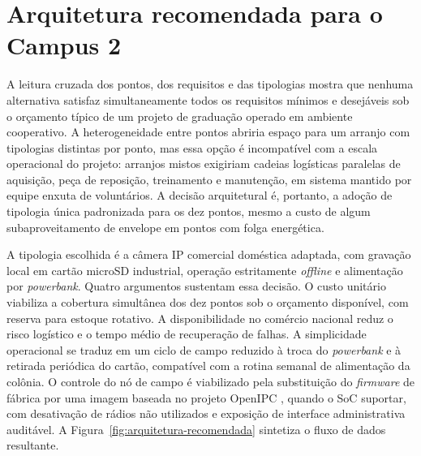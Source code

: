 \section{Arquitetura recomendada para o Campus 2}
\label{sec:cap2-arquitetura}


A leitura cruzada dos pontos, dos requisitos e das tipologias mostra que nenhuma alternativa satisfaz simultaneamente todos os requisitos mínimos e desejáveis sob o orçamento típico de um projeto de graduação operado em ambiente cooperativo. A heterogeneidade entre pontos abriria espaço para um arranjo com tipologias distintas por ponto, mas essa opção é incompatível com a escala operacional do projeto: arranjos mistos exigiriam cadeias logísticas paralelas de aquisição, peça de reposição, treinamento e manutenção, em sistema mantido por equipe enxuta de voluntários. A decisão arquitetural é, portanto, a adoção de tipologia única padronizada para os dez pontos, mesmo a custo de algum subaproveitamento de envelope em pontos com folga energética.


A tipologia escolhida é a câmera IP comercial doméstica adaptada, com gravação local em cartão microSD industrial, operação estritamente \textit{offline} e alimentação por \textit{powerbank}. Quatro argumentos sustentam essa decisão. O custo unitário viabiliza a cobertura simultânea dos dez pontos sob o orçamento disponível, com reserva para estoque rotativo. A disponibilidade no comércio nacional reduz o risco logístico e o tempo médio de recuperação de falhas. A simplicidade operacional se traduz em um ciclo de campo reduzido à troca do \textit{powerbank} e à retirada periódica do cartão, compatível com a rotina semanal de alimentação da colônia. O controle do nó de campo é viabilizado pela substituição do \textit{firmware} de fábrica por uma imagem baseada no projeto OpenIPC \cite{openipc2025}, quando o SoC suportar, com desativação de rádios não utilizados e exposição de interface administrativa auditável. A Figura~\ref{fig:arquitetura-recomendada} sintetiza o fluxo de dados resultante.



